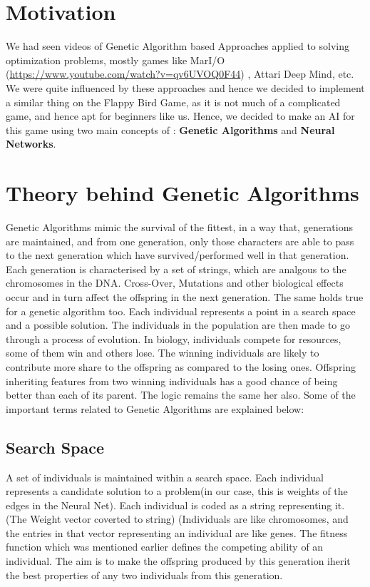 \documentclass{article}
\begin{document}
\section{Motivation}

We had seen videos of Genetic Algorithm based Approaches applied to solving optimization problems, mostly games like MarI/O (\url{https://www.youtube.com/watch?v=qv6UVOQ0F44}) , Attari Deep Mind, etc. We were quite influenced by these approaches and hence we decided to implement a similar thing on the Flappy Bird Game, as it is not much of a complicated game, and hence apt for beginners like us. Hence, we decided to make an AI for this game using two main concepts of : \textbf{Genetic Algorithms} and \textbf{Neural Networks}.

\section{Theory behind Genetic Algorithms}

Genetic Algorithms mimic the survival of the fittest, in a way that, generations are maintained, and from one generation, only those characters are able to pass to the next generation which have survived/performed well in that generation. Each generation is characterised by a set of strings, which are analgous to the chromosomes in the DNA. Cross-Over, Mutations and other biological effects occur and in turn affect the offspring in the next generation. The same holds true for a genetic algorithm too. Each individual represents a point in a search space and a possible solution. The individuals in the population are then made to go through a process of evolution.
\hfill \break
\hfill \break
In biology, individuals compete for resources, some of them win and others lose. The winning individuals are likely to contribute more share to the offspring as compared to the losing ones. Offspring inheriting features from two winning individuals has a good chance of being better than each of its parent. The logic remains the same her also. Some of the important terms related to Genetic Algorithms are explained below:  

\subsection{Search Space}

A set of individuals is maintained within a search space. Each individual represents a candidate solution to a problem(in our case, this is weights of the edges in the Neural Net). Each individual is coded as a string representing it. (The Weight vector coverted to string) (Individuals are like chromosomes, and the entries in that vector representing an individual are like genes. The fitness function which was mentioned earlier defines the competing ability of an individual. The aim is to make the offspring produced by this generation iherit the best properties of any two individuals from this generation.
\end{document}
